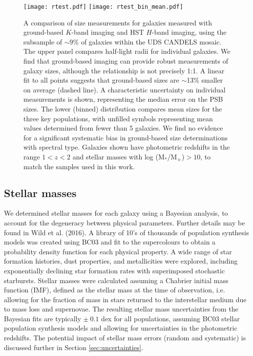 \documentclass[a4paper,fleqn,usenatbib,useAMS]{mnras}
\begin{document}
\begin{figure}
	\texttt{[image: rtest.pdf]}
        \texttt{[image: rtest\_bin\_mean.pdf]}
    \caption{A comparison of size measurements for galaxies measured
      with ground-based $K$-band imaging and HST $H$-band imaging,
      using the subsample of $\sim$9\% of galaxies within the UDS
      CANDELS mosaic. The upper panel compares half-light radii for
      individual galaxies. We find that ground-based imaging can
      provide robust measurements of galaxy sizes, although the
      relationship is not precisely 1:1. A linear fit to all points
      suggests that ground-based sizes are $\sim$13\% smaller on
      average (dashed line).  A characteristic uncertainty on
      individual measurements is shown, representing the median error
      on the PSB sizes.  The lower (binned) distribution compares mean
      sizes for the three key populations, with unfilled symbols
      representing mean values determined from fewer than 5 galaxies.
      We find no evidence for a significant systematic bias in
      ground-based size determinations with spectral type. Galaxies
      shown have photometric redshifts in the range $1<z<2$ and
      stellar masses with log (M$_{\ast}$/M$_{\sun}$)$>10$, to match
      the samples used in this work.}
    \label{fig:size-test}
\end{figure}

\subsection{Stellar masses}
\label{sec:masses}

We determined stellar masses for each galaxy using a Bayesian
analysis, to account for the degeneracy between physical parameters.
Further details may be found in Wild et al. (2016).  A library of 10's
of thousands of population synthesis models was created using BC03 and
fit to the supercolours to obtain a probability density function for
each physical property. A wide range of star formation histories, dust
properties, and metallicities were explored, including exponentially
declining star formation rates with superimposed stochastic
starbursts. Stellar masses were calculated assuming a Chabrier initial
mass function (IMF), defined as the stellar mass at the time of
observation, i.e. allowing for the fraction of mass in stars returned
to the interstellar medium due to mass loss and supernovae.  The
resulting stellar mass uncertainties from the Bayesian fits are
typically $\pm ~0.1$ dex for all populations,
assuming BC03 stellar
population synthesis models and allowing for uncertainties in the
photometric redshifts. 
The potential impact of stellar mass errors
(random and systematic) is discussed further in Section
\ref{sec:uncertainties}.
\end{document}
